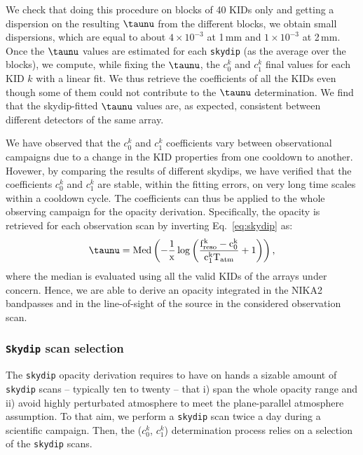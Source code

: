 %
{\lp We check that doing this procedure on blocks of 40 KIDs only and
getting a dispersion on the resulting $\taunu$ from the different
blocks, we obtain small dispersions, which are equal to about
$4\times 10^{-3}$ at 1\,mm and $1\times 10^{-3}$ at 2\,mm. }
Once the $\taunu$ values are estimated for each {\tt skydip} (as the average over the
blocks), we compute, while fixing the $\taunu$, the $c_0^k$ and $c_1^k$
final values for each KID $k$ with a linear fit. We thus retrieve
the coefficients of all the KIDs even though some of them could not
contribute to the $\taunu$ determination. We find that the skydip-fitted
$\taunu$ values are, as expected, consistent between different detectors of
the same array.

{\lp We have observed that the  $c_0^k$ and $c_1^k$ coefficients vary
between observational campaigns due to a change in the KID properties
from one cooldown to another.}
Hovewer, by comparing the results of different skydips, we have verified that the
coefficients $c_0^k$ and $c_1^k$ are stable, within the fitting errors, on very
long time scales within a cooldown cycle. The coefficients can thus be
applied to the whole observing campaign for the opacity derivation. %
Specifically, the opacity %
is retrieved for each observation scan by
inverting Eq.~\ref{eq:skydip} as:
\begin{equation}
\taunu =   \rm{Med}\left( -\frac{1}{x} \log\left( \frac{f_{\rm{reso}}^k - c_0^k}{c_1^kT_{\rm{atm}}} +1 \right)\right), 
\end{equation}
where the median is evaluated using all the valid
KIDs of the arrays under concern. Hence, we are able to derive an opacity
integrated in the NIKA2 bandpasses and in the line-of-sight of the
source in the considered observation scan.

\subsubsection{{\tt Skydip} scan selection}
\label{se:skydip-selection}

The {\tt skydip} opacity derivation requires to have on hands a
sizable amount of {\tt skydip} scans --
typically ten to twenty -- that i) span the whole opacity range and
ii) avoid highly perturbated atmosphere to meet the plane-parallel
atmosphere assumption. To that aim, we perform a {\tt skydip}
scan twice a day during a scientific campaign. Then, the ($c_0^k$, $c_1^k$)
determination process relies on a selection of the {\tt skydip} scans.

